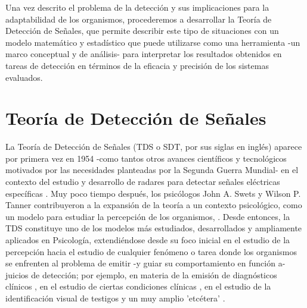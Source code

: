 Una vez descrito el problema de la detección y sus implicaciones para la adaptabilidad de los organismos, procederemos a desarrollar la Teoría de Detección de Señales, que permite describir este tipo de situaciones con un modelo matemático y estadístico que puede utilizarse como una herramienta -un marco conceptual y de análisis- para interpretar los resultados obtenidos en tareas de detección en términos de la eficacia y precisión de los sistemas evaluados.\\

\section{Teoría de Detección de Señales}

La Teoría de Detección de Señales (TDS o SDT, por sus siglas en inglés) aparece por primera vez en 1954 -como tantos otros avances científicos y tecnológicos motivados por las necesidades planteadas por la Segunda Guerra Mundial- en el contexto del estudio y desarrollo de radares para detectar señales eléctricas específicas \parencite{Peterson1954}. Muy poco tiempo después, los psicólogos John A. Swets y Wilson P. Tanner contribuyeron a la expansión de la teoría a un contexto psicológico, como un modelo para estudiar la percepción de los organismos, \parencite{Tanner1954, Swets1961}. Desde entonces, la TDS constituye uno de los modelos más estudiados, desarrollados y ampliamente aplicados en Psicología, extendiéndose desde su foco inicial en el estudio de la percepción \parencite{Rosenholtz2001, Pessoa2005, Wallis2007} hacia el estudio de cualquier fenómeno o tarea donde los organismos se enfrenten al problema de emitir -y guiar su comportamiento en función a- juicios de detección; por ejemplo, en materia de la emisión de diagnósticos clínicos \parencite{Grossberg1978, Swets2000, Boutis2010}, en el estudio de ciertas condiciones clínicas \parencite{Westermann2010, Bonnel2003, Brown1994, Naliboff1981}, en el estudio de la identificación visual de testigos \parencite{Gronlund2014, Wixted2014, Wixted2016} y un muy amplio 'etcétera' \parencite{Gordon1974, Nuechterlein1983, Harvey1992, Verghese2001}.\\ 


